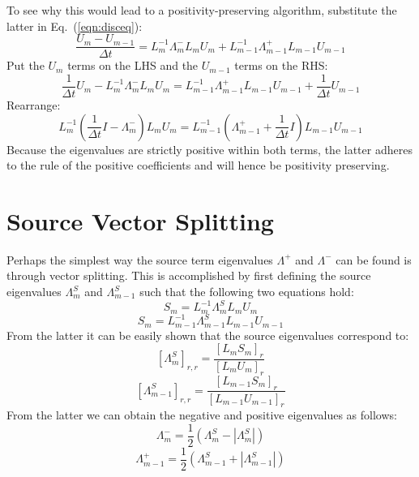 \documentclass{warpdoc}
\begin{document}
To see why this would lead to a positivity-preserving algorithm, substitute the latter in Eq.\ (\ref{eqn:disceq}):
%
\begin{equation}
\frac{U_{m}-U_{m-1}}{\Delta t} = L^{-1}_{m} \Lambda_{m}^- L_{m} U_{m} + L^{-1}_{m-1} \Lambda_{m-1}^+ L_{m-1} U_{m-1}
\end{equation}
%
Put the $U_m$ terms on the LHS and the $U_{m-1}$ terms on the RHS:
%
\begin{equation}
\frac{1}{\Delta t} U_{m} - L^{-1}_{m} \Lambda_{m}^- L_{m} U_{m}
=
   L^{-1}_{m-1} \Lambda_{m-1}^+ L_{m-1} U_{m-1} + \frac{1}{\Delta t} U_{m-1}
\end{equation}
%
Rearrange:
%
\begin{equation}
 L^{-1}_{m} \left(\frac{1}{\Delta t} I -  \Lambda_{m}^-  \right) L_{m} U_{m}
=
   L^{-1}_{m-1} \left( \Lambda_{m-1}^+ + \frac{1}{\Delta t} I \right) L_{m-1} U_{m-1} 
\end{equation}
%
Because the  eigenvalues are strictly positive within both terms, the latter adheres to the rule of the positive coefficients and will hence be positivity preserving. 


\section{Source Vector Splitting}

Perhaps the simplest way the source term eigenvalues $\Lambda^+$ and $\Lambda^-$ can be found is through vector splitting. This is accomplished by first defining the source eigenvalues $\Lambda_{m}^S$ and $\Lambda_{m-1}^S$ such that the following two equations hold:
%
\begin{equation}
 S_{m} = L^{-1}_{m} \Lambda_{m}^S L_{m} U_{m}
\end{equation}
%
%
\begin{equation}
 S_{m} = L^{-1}_{m-1} \Lambda_{m-1}^S L_{m-1} U_{m-1}
\end{equation}
%
From the latter it can be easily shown that the source eigenvalues correspond to:
%
\begin{equation}
\left[ \Lambda_{m}^S\right]_{r,r}=\frac{ \left[ L_{m} S_{m} \right]_{r}}{\left[L_{m} U_{m}\right]_r}  
\end{equation}
%
%
\begin{equation}
\left[ \Lambda_{m-1}^S\right]_{r,r}=\frac{ \left[ L_{m-1} S_{m} \right]_{r}}{\left[L_{m-1} U_{m-1}\right]_r}  
\end{equation}
%
From the latter we can obtain the negative and positive eigenvalues as follows:
%
\begin{equation}
\Lambda_m^- = \frac{1}{2} \left( \Lambda_m^S - |\Lambda_m^S| \right)
\end{equation}
%
%
\begin{equation}
\Lambda_{m-1}^+ = \frac{1}{2} \left( \Lambda_{m-1}^S + |\Lambda_{m-1}^S| \right)
\end{equation}
%
\end{document}
